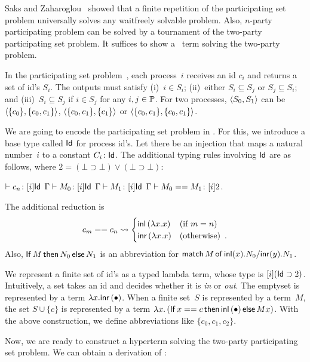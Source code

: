 {Saks and Zaharoglou~\cite{Saks:1993vq} showed that a finite repetition of the participating set
problem universally solves any waitfreely solvable problem.
Also, $n$-party participating problem can be solved by a tournament of
the two-party participating set problem.
It suffices to show a \lgd\, term solving the two-party problem.


In the participating set problem~\cite{borowsky},
each process~$i$ receives an id $c_i$ and
returns a set of id's $S_i$.
The outputs must satisfy (i)~$i\in S_i$; (ii)~either $S_i\subseteq S_j$
or $S_j\subseteq S_i$; and (iii)~$S_i\subseteq S_j$  if $i\in S_j$ for any
$i,j\in\mathbb{P}$.
For two processes,
$\langle{S_0, S_1}\rangle$ can be $\langle{\{c_0\}, \{c_0, c_1\}}\rangle$, $\langle{\{c_0, c_1\}, \{c_1\}}\rangle$
or
$\langle{\{c_0, c_1\}, \{c_0, c_1\}}\rangle$.

We are going to encode the participating set problem in \lgd.
For this, we introduce a base type called $\mathsf{Id}$ for process id's.
Let there be an injection that maps a natural number~$i$ to a constant
$C_i\colon\mathsf{Id}$.
The additional typing rules involving $\mathsf{Id}$ are as follows, where $2 = (\bot\supset\bot)\vee(\bot\supset\bot)$:
\begin{center}
 \UnaryRule{}{}
 {$\vdash {c_n} \colon{[i]\mathsf{Id}}$}
 \hfill
 \BinaryRule
 {$\Gamma\vdash {M_0} \colon{[}i]\mathsf{Id}$}
 {$\Gamma\vdash {M_1} \colon{[}i]\mathsf{Id}$}
 {}
 {$\Gamma \vdash {{M_0} == {M_1}} \colon{[i]2}$}\enspace.
\end{center}
The additional reduction is
\[
 c_m == c_n \rightsquigarrow
\begin{cases}
 \mathsf{inl}\left({\lambda x.x}\right)& (\text{if } m = n)\\
 \mathsf{inr}\left({\lambda x.x}\right)& (\text{otherwise})\enspace.
\end{cases}
\]
Also,
${\mathsf{If}\, {M}\, \mathsf{then}\, {N_0}\, \mathsf{else}\, {N_1}}$
is an abbreviation for
${\mathsf{match}\,{M}\,\mathsf{of}\, \mathsf{inl}({x}). {N_0}/ \mathsf{inr}({y}). {N_1}}$.

We represent a finite set of id's as a
typed lambda term, whose type is $[i](\mathsf{Id}\supset 2)$.  Intuitively, a
set takes an id and decides whether it is \textit{in} or \textit{out}.
The emptyset is represented by a term $\lambda x. \mathsf{inr}\left({\bullet}\right)$.
When a finite set~$S$ is represented by a term~$M$,
the set $S \cup \{c\}$ is represented by a term
$\lambda x.\left(\mathsf{If}\, {x==c}\, \mathsf{then}\, {\mathsf{inl}\left({\bullet}\right)}\, \mathsf{else}\, {Mx}\right)$.
With the above construction, we define abbreviations
like $\{c_0, c_1, c_2\}$.

Now, we are ready to construct a hyperterm solving the two-party
participating set problem.
We can obtain a derivation of :

}
